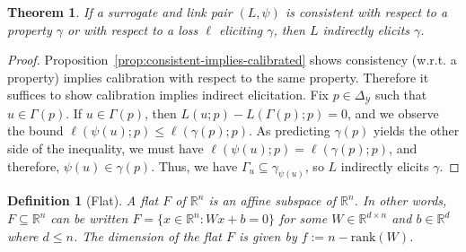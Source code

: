 \documentclass{article}
\newcommand{\reals}{\mathbb{R}}
\newcommand{\simplex}{\Delta_\Y}
\newcommand{\prop}[1]{\mathrm{prop}[#1]}
\newcommand{\E}{\mathbb{E}}
\newcommand{\F}{\mathcal{F}}
\newcommand{\X}{\mathcal{X}}
\newcommand{\Y}{\mathcal{Y}}
\newtheorem{theorem}{Theorem}
\newtheorem{definition}{Definition}
\DeclareMathOperator*{\arginf}{arg\,inf}
\begin{document}
\begin{theorem}\label{prop:consistent-implies-indir-elic}
	If a surrogate and link pair $(L, \psi)$ is consistent with respect to a property $\gamma$ or with respect to a loss $\ell$ eliciting $\gamma$, then $L$ indirectly elicits $\gamma$.
\end{theorem}
\begin{proof}
Proposition~\ref{prop:consistent-implies-calibrated} shows consistency (w.r.t. a property) implies calibration with respect to the same property.
Therefore it suffices to show calibration implies indirect elicitation.
Fix $p \in \simplex$ such that $u \in \Gamma(p)$.
If $u \in \Gamma(p)$, then $L(u;p) - L(\Gamma(p); p) = 0$, and we observe the bound $\ell(\psi(u); p) \leq \ell(\gamma(p); p)$.
As predicting $\gamma(p)$ yields the other side of the inequality, we must have $\ell(\psi(u);p) = \ell(\gamma(p); p)$, and therefore, $\psi(u) \in \gamma(p)$.
Thus, we have $\Gamma_u \subseteq \gamma_{\psi(u)}$, so $L$ indirectly elicits $\gamma$.

%
\end{proof}

\begin{definition}[Flat]
	A \emph{flat} $F$ of $\reals^n$ is an affine subspace of $\reals^n$.
	In other words, $F\subseteq \reals^n$ can be written $F=\{x\in\reals^n : Wx + b = 0\}$ for some $W\in\reals^{d\times n}$ and $b\in\reals^d$ where $d\leq n$.
	The dimension of the flat $F$ is given by $f := n - \mathrm{rank}(W)$.
\end{definition}
\end{document}
